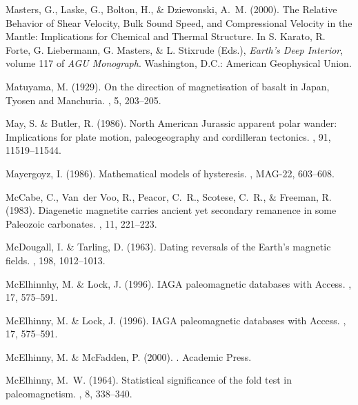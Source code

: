 Masters, G., Laske, G., Bolton, H., \& Dziewonski, A.~M. (2000).
\newblock The Relative Behavior of Shear Velocity, Bulk Sound Speed, and
  Compressional Velocity in the Mantle: Implications for Chemical and Thermal
  Structure.
\newblock In S. Karato, R. Forte, G. Liebermann, G. Masters, \& L. Stixrude
  (Eds.), {\em Earth's Deep Interior}, volume 117 of {\em AGU Monograph}.
  Washington, D.C.: American Geophysical Union.

Matuyama, M. (1929).
\newblock On the direction of magnetisation of basalt in Japan, Tyosen and
  Manchuria.
, 5, 203--205.

May, S. \& Butler, R. (1986).
\newblock North American Jurassic apparent polar wander: Implications for plate
  motion, paleogeography and cordilleran tectonics.
, 91, 11519--11544.

Mayergoyz, I. (1986).
\newblock Mathematical models of hysteresis.
, MAG-22, 603--608.

McCabe, C., Van~der Voo, R., Peacor, C.~R., Scotese, C.~R., \& Freeman, R.
  (1983).
\newblock Diagenetic magnetite carries ancient yet secondary remanence in some
  Paleozoic carbonates.
, 11, 221--223.

McDougall, I. \& Tarling, D. (1963).
\newblock Dating reversals of the Earth's magnetic fields.
, 198, 1012--1013.

McElhinnhy, M. \& Lock, J. (1996).
\newblock IAGA paleomagnetic databases with Access.
, 17, 575--591.

McElhinny, M. \& Lock, J. (1996).
\newblock IAGA paleomagnetic databases with Access.
, 17, 575--591.

McElhinny, M. \& McFadden, P. (2000).
.
\newblock Academic Press.

McElhinny, M.~W. (1964).
\newblock Statistical significance of the fold test in paleomagnetism.
, 8, 338--340.


